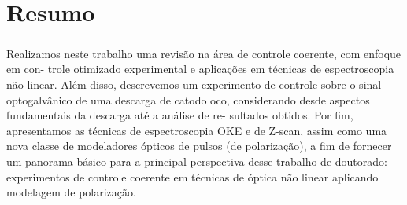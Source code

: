 \chapter*{Resumo}
\paragraph{}

Realizamos neste trabalho uma revisão na área de controle coerente, com enfoque em con-
trole otimizado experimental e aplicações em técnicas de espectroscopia não linear. Além
disso, descrevemos um experimento de controle sobre o sinal optogalvânico de uma descarga
de catodo oco, considerando desde aspectos fundamentais da descarga até a análise de re-
sultados obtidos. Por fim, apresentamos as técnicas de espectroscopia OKE e de Z-scan,
assim como uma nova classe de modeladores ópticos de pulsos (de polarização), a fim de
fornecer um panorama básico para a principal perspectiva desse trabalho de doutorado:
experimentos de controle coerente em técnicas de óptica não linear aplicando modelagem
de polarização.

